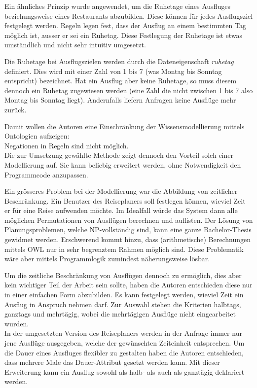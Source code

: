 Ein ähnliches Prinzip wurde angewendet, um die Ruhetage eines Ausfluges beziehungsweise eines Restaurants abzubilden. Diese können für jedes Ausflugsziel festgelegt werden. Regeln legen fest, dass der Ausflug an einem bestimmten Tag möglich ist, ausser er sei ein Ruhetag. Diese Festlegung der Ruhetage ist etwas umständlich und nicht sehr intuitiv umgesetzt.

Die Ruhetage bei Ausflugszielen werden durch die Dateneigenschaft \textit{ruhetag} definiert. Dies wird mit einer Zahl von 1 bis 7 (was Montag bis Sonntag entspricht) bezeichnet. Hat ein Ausflug aber keine Ruhetage, so muss diesem dennoch ein Ruhetag zugewiesen werden (eine Zahl die nicht zwischen 1 bis 7 also Montag bis Sonntag liegt). Andernfalls liefern Anfragen keine Ausflüge mehr zurück.

Damit wollen die Autoren eine Einschränkung der Wissensmodellierung mittels Ontologien aufzeigen:\\
Negationen in Regeln sind nicht möglich.\\
Die zur Umsetzung gewählte Methode zeigt dennoch den Vorteil solch einer Modellierung auf. Sie kann beliebig erweitert werden, ohne Notwendigkeit den Programmcode anzupassen.

Ein grösseres Problem bei der Modellierung war die Abbildung von zeitlicher Beschränkung. Ein Benutzer des Reiseplaners soll festlegen können, wieviel Zeit er für eine Reise aufwenden möchte. Im Idealfall würde das System dann alle möglichen Permutationen von Ausflügen berechnen und auflisten. Der Lösung von Planungsproblemen, welche NP-vollständig sind, kann eine ganze Bachelor-Thesis gewidmet werden. Erschwerend kommt hinzu, dass (arithmetische) Berechnungen mittels OWL nur in sehr begrenztem Rahmen möglich sind. Diese Problematik wäre aber mittels Programmlogik zumindest näherungsweise lösbar.

Um die zeitliche Beschränkung von Ausflügen dennoch zu ermöglich, dies aber kein wichtiger Teil der Arbeit sein sollte, haben die Autoren entschieden diese nur in einer einfachen Form abzubilden. Es kann festgelegt werden, wieviel Zeit ein Ausflug in Anspruch nehmen darf. Zur Auswahl stehen die Kriterien halbtags, ganztags und mehrtägig, wobei die mehrtägigen Ausflüge nicht eingearbeitet wurden.\\
In der umgesetzten Version des Reiseplaners werden in der Anfrage immer nur jene Ausflüge ausgegeben, welche der gewünschten Zeiteinheit entsprechen. Um die Dauer eines Ausfluges flexibler zu gestalten haben die Autoren entschieden, dass mehrere Male das Dauer-Attribut gesetzt werden kann. Mit dieser Erweiterung kann ein Ausflug sowohl als halb- als auch als ganztägig deklariert werden.

